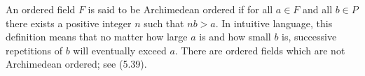 An ordered field $F$ is said to be Archimedean ordered if for all $a \in F$ and all $b \in P$ there exists a positive integer $n$ such that $n b > a$. In intuitive language, this definition means that no matter how large $a$ is and how small $b$ is, successive repetitions of $b$ will eventually exceed $a$. There are ordered fields which are not Archimedean ordered; see (5.39).